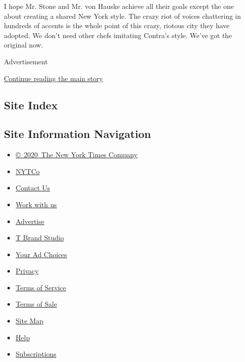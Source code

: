 I hope Mr. Stone and Mr. von Hauske achieve all their goals except the
one about creating a shared New York style. The crazy riot of voices
chattering in hundreds of accents is the whole point of this crazy,
riotous city they have adopted. We don't need other chefs imitating
Contra's style. We've got the original now.

Advertisement

\protect\hyperlink{after-bottom}{Continue reading the main story}

\hypertarget{site-index}{%
\subsection{Site Index}\label{site-index}}

\hypertarget{site-information-navigation}{%
\subsection{Site Information
Navigation}\label{site-information-navigation}}

\begin{itemize}
\tightlist
\item
  \href{https://help.nytimes3xbfgragh.onion/hc/en-us/articles/115014792127-Copyright-notice}{©~2020~The
  New York Times Company}
\end{itemize}

\begin{itemize}
\tightlist
\item
  \href{https://www.nytco.com/}{NYTCo}
\item
  \href{https://help.nytimes3xbfgragh.onion/hc/en-us/articles/115015385887-Contact-Us}{Contact
  Us}
\item
  \href{https://www.nytco.com/careers/}{Work with us}
\item
  \href{https://nytmediakit.com/}{Advertise}
\item
  \href{http://www.tbrandstudio.com/}{T Brand Studio}
\item
  \href{https://www.nytimes3xbfgragh.onion/privacy/cookie-policy\#how-do-i-manage-trackers}{Your
  Ad Choices}
\item
  \href{https://www.nytimes3xbfgragh.onion/privacy}{Privacy}
\item
  \href{https://help.nytimes3xbfgragh.onion/hc/en-us/articles/115014893428-Terms-of-service}{Terms
  of Service}
\item
  \href{https://help.nytimes3xbfgragh.onion/hc/en-us/articles/115014893968-Terms-of-sale}{Terms
  of Sale}
\item
  \href{https://spiderbites.nytimes3xbfgragh.onion}{Site Map}
\item
  \href{https://help.nytimes3xbfgragh.onion/hc/en-us}{Help}
\item
  \href{https://www.nytimes3xbfgragh.onion/subscription?campaignId=37WXW}{Subscriptions}
\end{itemize}
